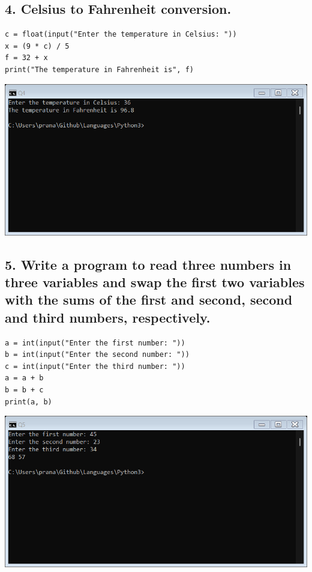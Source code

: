 \documentclass[12pt]{article}
\begin{document}
\subsection*{4. Celsius to Fahrenheit conversion.}
\begin{verbatim}
c = float(input("Enter the temperature in Celsius: "))
x = (9 * c) / 5
f = 32 + x
print("The temperature in Fahrenheit is", f)
\end{verbatim}
\includegraphics[width=\linewidth]{images/4.png}

\subsection*{5. Write a program to read three numbers in three variables and swap the first two variables with the sums of the first and second, second and third numbers, respectively.}
\begin{verbatim}
a = int(input("Enter the first number: "))
b = int(input("Enter the second number: "))
c = int(input("Enter the third number: "))
a = a + b
b = b + c
print(a, b)
\end{verbatim}
\includegraphics[width=\linewidth]{images/5.png}
\end{document}
